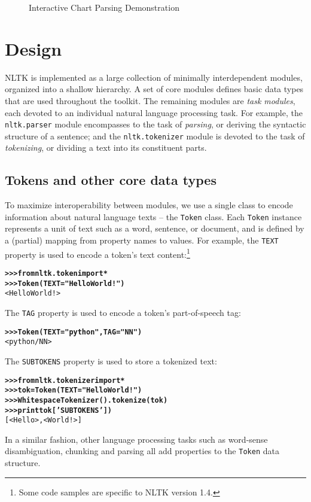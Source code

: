 \documentclass[11pt]{article}
\def\object#1{\texttt{\small #1}}
\begin{document}
\begin{figure}[bth]
\caption{Interactive Chart Parsing Demonstration}
\label{fig:chart}
\end{figure}

\section{Design}

NLTK is implemented as a large collection of minimally interdependent
modules, organized into a shallow hierarchy.  A set of core
modules defines basic data types that are used throughout the toolkit.
The remaining modules are \emph{task modules}, each devoted to an
individual natural language processing task.  For example, the
\object{nltk.parser} module encompasses to the task of
\emph{parsing}, or deriving the syntactic structure of a sentence; and
the \object{nltk.tokenizer} module is devoted to the task of
\emph{tokenizing}, or dividing a text into its constituent parts.

\subsection{Tokens and other core data types}

To maximize interoperability between modules, we use a
single class to encode information about natural language texts -- the
\object{Token} class.  Each \object{Token} instance represents a
unit of text such as a word, sentence, or document, and is
defined by a (partial) mapping from property names to values.  For
example, the \object{TEXT} property is used to encode a token's text
content:\footnote{Some code samples are specific to NLTK
  version 1.4.}

\begin{alltt}\small
\textbf{>>> from nltk.token import *}
\textbf{>>> Token(TEXT="Hello World!")}
<Hello World!>
\end{alltt}
%
The \object{TAG} property is used to encode a token's part-of-speech
tag:

\begin{alltt}\small
\textbf{>>> Token(TEXT="python", TAG="NN")}
<python/NN>
\end{alltt}
%
The \object{SUBTOKENS} property is used to store a tokenized text:

\begin{alltt}\small
\textbf{>>> from nltk.tokenizer import *}
\textbf{>>> tok = Token(TEXT="Hello World!")}
\textbf{>>> WhitespaceTokenizer().tokenize(tok)}
\textbf{>>> print tok['SUBTOKENS'])}
[<Hello>, <World!>]
\end{alltt}
%
In a similar fashion, other language processing tasks such as
word-sense disambiguation, chunking and parsing all add properties to
the \object{Token} data structure.
\end{document}
